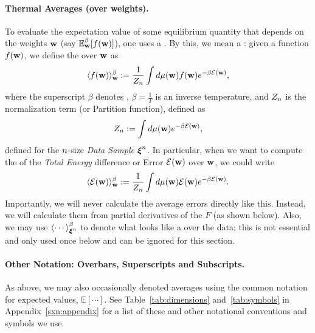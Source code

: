 \paragraph{Thermal Averages (over weights).}

To evaluate the expectation value of some equilibrium quantity that depends on the weights ${\mathbf{w}}$ (say $\mathbb{E}^{\beta}_{{\mathbf{w}}}[f({\mathbf{w}})]$), one uses a \ThermalAverage.
By this, we mean a \emph{\BoltzmannWeightedAverage}: given a function $f({\mathbf{w}})$,
we define the \ThermalAverage over ${\mathbf{w}}$ as
\begin{align}
\label{eqn:thrmavg}
\langle f({\mathbf{w}})\rangle_{{\mathbf{w}}}^{{\beta}}:=\dfrac{1}{Z_{n}}\int d\mu({\mathbf{w}}) f({\mathbf{w}})e^{-\beta \mathcal{E}(\mathbf{w})}  ,
\end{align}
where the superscript $\beta$ denotes \ThermalAverage,
$\beta=\frac{1}{T}$ is an inverse temperature, and 
$Z_{n}$ is the normalization term (or Partition function), defined as
\begin{align}
\label{eqn:Zwn}
Z_{n}:=\int d\mu({\mathbf{w}}) e^{-\beta \mathcal{E}(\mathbf{w})},
\end{align}
defined for the $n$-size \emph{Data Sample} $\boldsymbol{\xi}^{n}$.
%
In particular, when we want to compute the \ThermalAverage of the \emph{Total Energy} difference or Error
$\mathcal{E}(\mathbf{w})$ over ${\mathbf{w}}$, we could write
\begin{align}
\label{eqn:Detot}
\langle \mathcal{E}(\mathbf{w}) \rangle^{\beta}_{{\mathbf{w}}}:=\dfrac{1}{Z_{n}}\int d\mu({\mathbf{w}}) \mathcal{E}(\mathbf{w}) e^{-\beta \mathcal{E}(\mathbf{w})} .
\end{align}
Importantly, we will never calculate the average errors directly like this.
Instead, we will calculate them from partial derivatives of the \FreeEnergy $F$ (as shown below).
Also, we may use $\langle \cdots \rangle^{\beta}_{\boldsymbol{\xi}^{n}}$ to denote what looks like a \ThermalAverage over the data;
this is not essential and only used once below and can be ignored for this section.

\paragraph{Other Notation: Overbars, Superscripts and Subscripts.}
As above, we may also occasionally denoted averages using the common notation for expected values, $\mathbb{E}[\cdots]$.
See Table~\ref{tab:dimensions} and~\ref{tab:symbols} in Appendix~\ref{sxn:appendix} for a list of these and other notational conventions and symbols we use.

